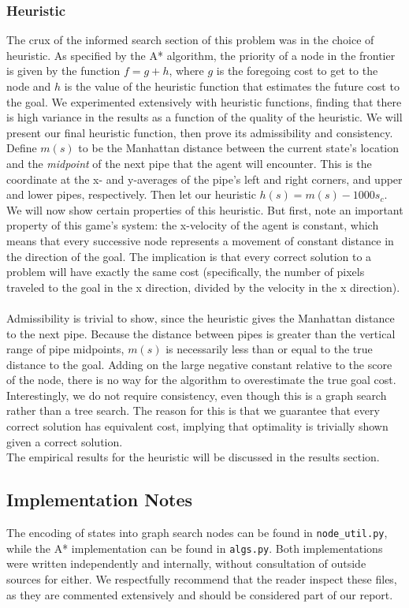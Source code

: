 \documentclass[11pt]{article}
\begin{document}
\subsubsection{Heuristic}
The crux of the informed search section of this problem was in the choice of heuristic.
As specified by the A* algorithm, the priority of a node in the frontier is given
by the function $f = g + h$, where $g$ is the foregoing cost to get to the node and
$h$ is the value of the heuristic function that estimates the future cost to the goal.
We experimented extensively with heuristic functions, finding that there is high variance
in the results as a function of the quality of the heuristic. We will present our
final heuristic function, then prove its admissibility and consistency. Define $m(s)$
to be the Manhattan distance between the current state's location and the \emph{midpoint}
of the next pipe that the agent will encounter. This is the coordinate at the x-
and y-averages of the pipe's left and right corners, and upper and lower pipes,
respectively. Then let our heuristic $h(s) = m(s) - 1000s_c$. We will now show certain
properties of this heuristic. But first, note an important property of this game's
system: the x-velocity of the agent is constant, which means that every successive
node represents a movement of constant distance in the direction of the goal.
The implication is that every correct solution to a problem will have exactly
the same cost (specifically, the number of pixels traveled to the goal in the x
direction, divided by the velocity in the x direction). \\\\
Admissibility is trivial to show, since the heuristic gives the Manhattan distance to
the next pipe. Because the distance between pipes is greater than the vertical range
of pipe midpoints, $m(s)$ is necessarily less than or equal to the true distance to the
goal. Adding on the large negative constant relative to the score of the node, there is no way
for the algorithm to overestimate the true goal cost.
Interestingly, we do not require consistency, even though this is a graph search
rather than a tree search. The reason for this is that we guarantee that every
correct solution has equivalent cost, implying that optimality is trivially shown
given a correct solution.\\
The empirical results for the heuristic will be discussed in the results section.

\subsection{Implementation Notes}
The encoding of states into graph search nodes can be found in \texttt{node\_util.py},
while the A* implementation can be found in \texttt{algs.py}. Both implementations
were written independently and internally, without consultation of outside sources
for either. We respectfully recommend that the reader inspect these files, as they are commented
extensively and should be considered part of our report.
\end{document}
